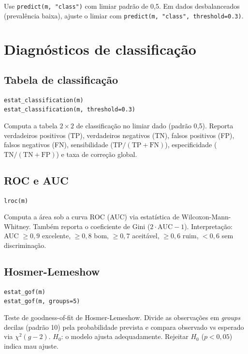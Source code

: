 \begin{nota}
  Use \lstinline{predict(m, "class")} com limiar padrão de 0{,}5.
  Em dados desbalanceados (prevalência baixa), ajuste o limiar com
  \lstinline{predict(m, "class", threshold=0.3)}.
\end{nota}

\section{Diagnósticos de classificação}

\subsection{Tabela de classificação}

\begin{lstlisting}
estat_classification(m)
estat_classification(m, threshold=0.3)
\end{lstlisting}

Computa a tabela $2\times2$ de classificação no limiar dado (padrão
0{,}5). Reporta verdadeiros positivos (TP), verdadeiros negativos (TN),
falsos positivos (FP), falsos negativos (FN), sensibilidade
($\mathrm{TP}/(\mathrm{TP}+\mathrm{FN})$), especificidade
($\mathrm{TN}/(\mathrm{TN}+\mathrm{FP})$) e taxa de correção global.

\subsection{ROC e AUC}

\begin{lstlisting}
lroc(m)
\end{lstlisting}

Computa a área sob a curva ROC (AUC) via estatística de
Wilcoxon-Mann-Whitney. Também reporta o coeficiente de Gini
($2\cdot\mathrm{AUC}-1$). Interpretação: AUC $\geq 0{,}9$ excelente,
$\geq 0{,}8$ bom, $\geq 0{,}7$ aceitável, $\geq 0{,}6$ ruim,
$< 0{,}6$ sem discriminação.

\subsection{Hosmer-Lemeshow}

\begin{lstlisting}
estat_gof(m)
estat_gof(m, groups=5)
\end{lstlisting}

Teste de goodness-of-fit de Hosmer-Lemeshow. Divide as observações em
\textit{groups} decilas (padrão 10) pela probabilidade prevista e
compara observado vs esperado via $\chi^2(g-2)$. $H_0$: o modelo ajusta
adequadamente. Rejeitar $H_0$ ($p < 0{,}05$) indica mau ajuste.
